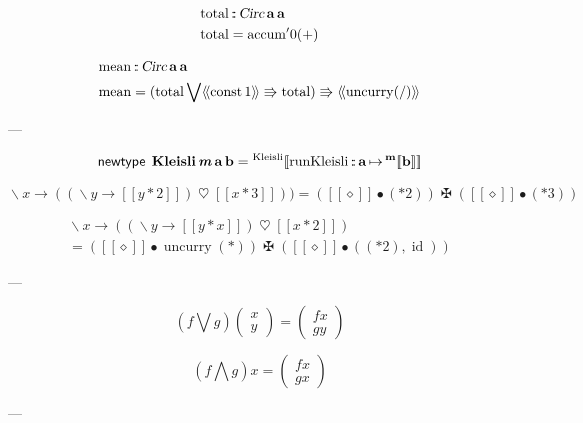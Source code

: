 \documentclass[a5paper,twoside,fleqn,draft]{jsbook}
\def\[{[\![}
\def\]{]\!]}
\newcommand{\Langle}{\langle\!\langle}
\newcommand{\Rangle}{\rangle\!\rangle}
\newcommand{\mKeyword}[1]{\mathsf{#1}}
\newcommand{\mNewTypeDeclKeyword}{\mKeyword{newtype}}
\DeclareMathOperator{\mNewTypeDecl}{\mNewTypeDeclKeyword}
\newcommand{\mAnonParam}{\diamond}
\newcommand{\mSpecialFunc}[1]{#1}
\DeclareMathOperator{\mConst}{\mSpecialFunc{const}}
\DeclareMathOperator{\mId}{\mSpecialFunc{id}}
\DeclareMathOperator{\mUncurry}{\mSpecialFunc{uncurry}}
\DeclareMathOperator{\mBind}{\heartsuit}
\DeclareMathOperator{\mBindComp}{\maltese}
\DeclareMathOperator{\mComp}{\bullet}
\DeclareMathOperator{\mIn}{{:\!:}}
\DeclareMathOperator{\mLambda}{\backslash}
\DeclareMathOperator{\mLambdaArrow}{\rightarrow}
\DeclareMathOperator{\mMapsTo}{\mapsto}
\newcommand{\mType}[1]{\mathbf{#1}} %
\newcommand{\mPolymorphicTypeParameter}[1]{\textbf{\textit{#1}}}
\newcommand{\mA}{\mType{a}}
\newcommand{\mB}{\mType{b}}
\newcommand{\mTypeAssemble}[2]{{}^{\mType{#1}}\[\mType{#2}\]}
\newcommand{\mValueConstructor}[1]{\mathrm{#1}}
\newcommand{\mValueWith}[2]{{}^\mValueConstructor{#1}\[#2\]}
\newcommand{\mJustWith}[1]{\[#1\]}%
\newcommand{\mArrowWith}[1]{\Langle#1\Rangle}
\newcommand{\mPairWith}[2]{\begin{pmatrix}#1\\#2\end{pmatrix}}
\begin{document}
\newcommand{\mTotal}{\mathop{\mathrm{total}}}

\begin{align}
  \mTotal&\mIn\mCircuitType\,\mA\,\mA\\
  \mTotal&={\mAccum}'0(+)
\end{align}


\begin{align}
  \mMean&\mIn\mCircuitType\,\mA\,\mA\\
  \mMean&=(\mTotal\mathbin{\bigvee}\mArrowWith{\mConst1}\Rrightarrow\mTotal)\Rrightarrow\mArrowWith{\mUncurry(/)}
\end{align}

---

\newcommand{\mKleisliType}{\mType{Kleisli}}
\newcommand{\mKleisliWith}[1]{\mValueWith{Kleisli}{#1}}
\newcommand{\mRunKleisli}{\mathop{\mathrm{runKleisli}}}

\begin{equation}
  \mNewTypeDecl\;
  \mKleisliType\,\mPolymorphicTypeParameter{m}\,\mA\,\mB
  =\mKleisliWith{\mRunKleisli\mIn\mA\mMapsTo\mTypeAssemble{m}{b}}
\end{equation}

\begin{equation}
  \mLambda x\mLambdaArrow((\mLambda y\mLambdaArrow\mJustWith{y*2})\mBind{}\mJustWith{x*3}))
  =(\mJustWith{\mAnonParam}\mComp(*2))\mBindComp(\mJustWith{\mAnonParam}\mComp(*3))
\end{equation}

\begin{multline}
  \mLambda x\mLambdaArrow((\mLambda y\mLambdaArrow\mJustWith{y*x})\mBind{}\mJustWith{x*2})\\
  =(\mJustWith{\mAnonParam}\mComp\mUncurry(*))\mBindComp(\mJustWith{\mAnonParam}\mComp{}((*2),\mId))
\end{multline}

---

\begin{equation}
  \left(f\bigvee g\right)\mPairWith{x}{y}=\mPairWith{fx}{gy}
\end{equation}

\begin{equation}
  \left(f\bigwedge g\right)x=\mPairWith{fx}{gx}
\end{equation}

---


\end{document}
